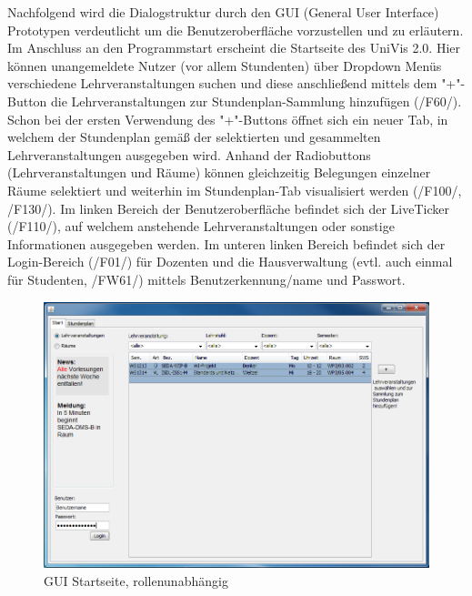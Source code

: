 Nachfolgend wird die Dialogstruktur durch den GUI (General User Interface) Prototypen verdeutlicht um die Benutzeroberfläche vorzustellen und zu erläutern.\\
Im Anschluss an den Programmstart erscheint die Startseite des UniVis 2.0. Hier können unangemeldete Nutzer (vor allem Stundenten) über Dropdown Menüs verschiedene Lehrveranstaltungen suchen und diese anschließend mittels dem "+"-Button die Lehrveranstaltungen zur Stundenplan-Sammlung hinzufügen (/F60/). Schon bei der ersten Verwendung des "+"-Buttons öffnet sich ein neuer Tab, in welchem der Stundenplan gemäß der selektierten und gesammelten Lehrveranstaltungen ausgegeben wird. Anhand der Radiobuttons (Lehrveranstaltungen und Räume) können gleichzeitig Belegungen einzelner Räume selektiert und weiterhin im Stundenplan-Tab visualisiert werden (/F100/, /F130/).
Im linken Bereich der Benutzeroberfläche befindet sich der LiveTicker (/F110/), auf welchem anstehende Lehrveranstaltungen oder sonstige Informationen ausgegeben werden.
Im unteren linken Bereich befindet sich der Login-Bereich (/F01/) für Dozenten und die Hausverwaltung (evtl. auch einmal für Studenten, /FW61/) mittels Benutzerkennung/name und Passwort.
\begin{figure}[H]
\begin{center}
\includegraphics[width=170mm]{images/section_7/HauptseiteAlle.PNG}
\caption{GUI Startseite, rollenunabhängig}
\label{img:hauptseite}
\end{center}
\end{figure}

